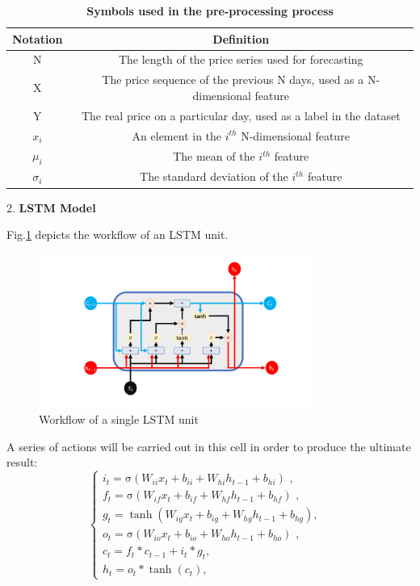 \documentclass{mcmthesis}
\begin{document}
\begin{table}[H]
	\caption{\textbf{Symbols used in the pre-processing process}}%
	\label{Nota_PrePro}
	\centering%
	\begin{tabular}{cc}%
		\toprule%
		Notation&Definition \\
		\midrule%
		N&The length of the price series used for forecasting \\
		X&The price sequence of the previous N days, used as a N-dimensional feature \\
		Y&The real price on a particular day, used as a label in the dataset 	\\
		$x_{i}$& An element in the $i^{th}$ N-dimensional feature\\
		$\mu_{i}$&The mean of the $i^{th}$ feature	\\
		$\sigma_{i}$&The standard deviation of the $i^{th}$ feature \\
		\bottomrule%
	\end{tabular}
\end{table}


2. \textbf{LSTM Model}

Fig.\ref{fig:LSTM_unit} depicts the workflow of an LSTM unit.
\begin{figure}[H]	%
	\centering
	\includegraphics[width=0.8\textwidth]{LSTM_Unit}	%
	\caption{Workflow of a single LSTM unit} \label{fig:LSTM_unit}		%
\end{figure}
A series of actions will be carried out in this cell in order to produce the ultimate result:
\begin{equation}
	\left\{
	\begin{array}{lr}
		i_{t}=\mathrm{\sigma}\left( W_{ii}x_{t}+b_{ii}+W_{hi}h_{t-1}+b_{hi} \right) \,\, , &  \\
			f_{t}=\mathrm{\sigma}\left( W_{if}x_{t}+b_{if}+W_{hf}h_{t-1}+b_{hf} \right) \,\,, &	\\
		g_{t}=\tanh \left( W_{ig}x_{t}+b_{ig}+W_{hg}h_{t-1}+b_{hg} \right) , &  \\
		o_{t}=\mathrm{\sigma}\left( W_{io}x_{t}+b_{io}+W_{ho}h_{t-1}+b_{ho} \right) \,\, , &	\\
		c_{t}=f_{t}*c_{t-1}+i_{t}*g_{t} , & 	\\
		h_{t}=o_{t}*\tanh \left(c_{t} \right) , &
	\end{array}
	\right.
\end{equation}
\end{document}
